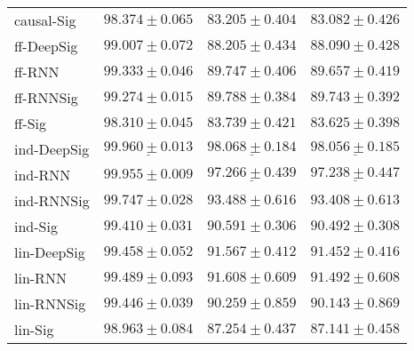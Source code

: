 \begin{tabular}{llll}
causal-Sig     &                           $ 98.374 \pm 0.065 $ &                           $ 83.205 \pm 0.404 $ &                           $ 83.082 \pm 0.426 $ \\
ff-DeepSig     &                           $ 99.007 \pm 0.072 $ &                           $ 88.205 \pm 0.434 $ &                           $ 88.090 \pm 0.428 $ \\
ff-RNN         &                           $ 99.333 \pm 0.046 $ &                           $ 89.747 \pm 0.406 $ &                           $ 89.657 \pm 0.419 $ \\
ff-RNNSig      &                           $ 99.274 \pm 0.015 $ &                           $ 89.788 \pm 0.384 $ &                           $ 89.743 \pm 0.392 $ \\
ff-Sig         &                           $ 98.310 \pm 0.045 $ &                           $ 83.739 \pm 0.421 $ &                           $ 83.625 \pm 0.398 $ \\
ind-DeepSig    &  $  \mathbf{ \underline{ 99.960 \pm 0.013 }} $ &  $  \mathbf{ \underline{ 98.068 \pm 0.184 }} $ &  $  \mathbf{ \underline{ 98.056 \pm 0.185 }} $ \\
ind-RNN        &               $  \mathbf{ 99.955 \pm 0.009 } $ &            $  \underline{ 97.266 \pm 0.439 } $ &            $  \underline{ 97.238 \pm 0.447 } $ \\
ind-RNNSig     &                           $ 99.747 \pm 0.028 $ &                           $ 93.488 \pm 0.616 $ &                           $ 93.408 \pm 0.613 $ \\
ind-Sig        &                           $ 99.410 \pm 0.031 $ &                           $ 90.591 \pm 0.306 $ &                           $ 90.492 \pm 0.308 $ \\
lin-DeepSig    &                           $ 99.458 \pm 0.052 $ &                           $ 91.567 \pm 0.412 $ &                           $ 91.452 \pm 0.416 $ \\
lin-RNN        &                           $ 99.489 \pm 0.093 $ &                           $ 91.608 \pm 0.609 $ &                           $ 91.492 \pm 0.608 $ \\
lin-RNNSig     &                           $ 99.446 \pm 0.039 $ &                           $ 90.259 \pm 0.859 $ &                           $ 90.143 \pm 0.869 $ \\
lin-Sig        &                           $ 98.963 \pm 0.084 $ &                           $ 87.254 \pm 0.437 $ &                           $ 87.141 \pm 0.458 $ \\

\end{tabular}
